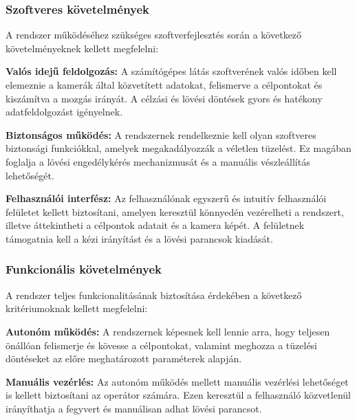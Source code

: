 \subsubsection*{Szoftveres követelmények}

A rendszer működéséhez szükséges szoftverfejlesztés során a következő követelményeknek kellett megfelelni:

\begin{list}{}{}
	\item \textbf{Valós idejű feldolgozás:}  A számítógépes látás szoftverének valós időben kell elemeznie a kamerák által közvetített adatokat, felismerve a célpontokat és kiszámítva a mozgás irányát. A célzási és lövési döntések gyors és hatékony adatfeldolgozást igényelnek.
	\item \textbf{Biztonságos működés:} A rendszernek rendelkeznie kell olyan szoftveres biztonsági funkciókkal, amelyek megakadályozzák a véletlen tüzelést. Ez magában foglalja a lövési engedélykérés mechanizmusát és a manuális vészleállítás lehetőségét.
	\item \textbf{Felhasználói interfész:} Az felhasználónak egyszerű és intuitív felhasználói felületet kellett biztosítani, amelyen keresztül könnyedén vezérelheti a rendszert, illetve áttekintheti a célpontok adatait és a kamera képét. A felületnek támogatnia kell a kézi irányítást és a lövési parancsok kiadását.
\end{list}




\subsubsection*{Funkcionális követelmények}

A rendszer teljes funkcionalitásának biztosítása érdekében a következő kritériumoknak kellett megfelelni:

\begin{list}{}{}
	\item \textbf{Autonóm működés:} A rendszernek képesnek kell lennie arra, hogy teljesen önállóan felismerje és kövesse a célpontokat, valamint meghozza a tüzelési döntéseket az előre meghatározott paraméterek alapján.
	\item \textbf{Manuális vezérlés:} Az autonóm működés mellett manuális vezérlési lehetőséget is kellett biztosítani az operátor számára. Ezen keresztül a felhasználó közvetlenül irányíthatja a fegyvert és manuálisan adhat lövési parancsot.
\end{list}

